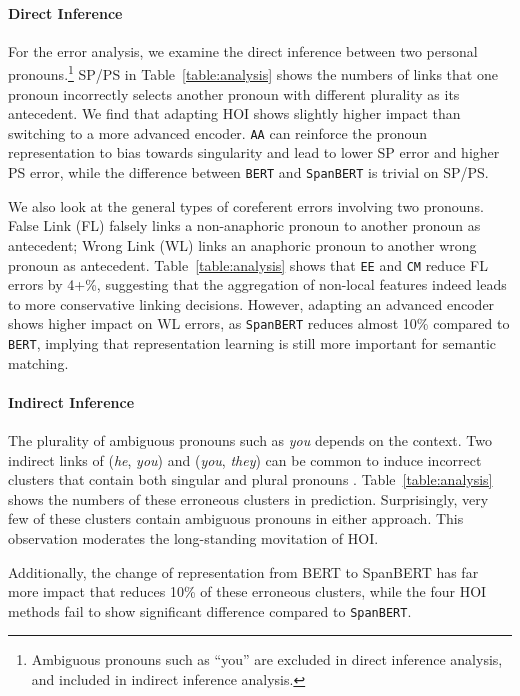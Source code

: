 \documentclass[11pt,a4paper]{article}
\begin{document}
\paragraph{Direct Inference}

For the error analysis, we examine the direct inference between two personal pronouns.\footnote{Ambiguous pronouns such as ``you'' are excluded in direct inference analysis, and included in indirect inference analysis.} 
SP/PS in Table~\ref{table:analysis} shows the numbers of links that one pronoun incorrectly selects another pronoun with different plurality as its antecedent. 
We find that adapting HOI shows slightly higher impact than switching to a more advanced encoder. 
\texttt{AA} can reinforce the pronoun representation to bias towards singularity and lead to lower SP error and higher PS error, while the difference between \texttt{BERT} and \texttt{SpanBERT} is trivial on SP/PS.

\noindent We also look at the general types of coreferent errors involving two pronouns. 
False Link (FL) falsely links a non-anaphoric pronoun to another pronoun as antecedent; Wrong Link (WL) links an anaphoric pronoun to another wrong pronoun as antecedent. Table~\ref{table:analysis} shows that \texttt{EE} and \texttt{CM} reduce FL errors by 4+\%, suggesting that the aggregation of non-local features indeed leads to more conservative linking decisions. 
However, adapting an advanced encoder shows higher impact on WL errors, as \texttt{SpanBERT} reduces almost 10\% compared to \texttt{BERT}, implying that representation learning is still more important for semantic matching.

\paragraph{Indirect Inference}

The plurality of ambiguous pronouns such as \textit{you} depends on the context. Two indirect links of (\textit{he}, \textit{you}) and (\textit{you}, \textit{they}) can be common to induce incorrect clusters that contain both singular and plural pronouns \citep{wiseman-etal-2016-learning,lee-etal-2018-higher}. Table~\ref{table:analysis} shows the numbers of these erroneous clusters in prediction. Surprisingly, very few of these clusters contain ambiguous pronouns in either approach. This observation moderates the long-standing movitation of HOI.

Additionally, the change of representation from BERT to SpanBERT has far more impact that reduces 10\% of these erroneous clusters, while the four HOI methods fail to show significant difference compared to \texttt{SpanBERT}.
\end{document}
